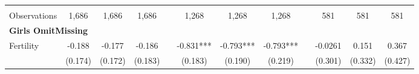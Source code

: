 \begin{landscape}
\begin{table}[htpb!]
\begin{center}
\begin{tabular}{lcccp{2mm}cccp{2mm}ccc}
\begin{footnotesize}\end{footnotesize}&\begin{footnotesize}\end{footnotesize}&\begin{footnotesize}\end{footnotesize}&\begin{footnotesize}\end{footnotesize}&\begin{footnotesize}\end{footnotesize}&\begin{footnotesize}\end{footnotesize}&\begin{footnotesize}\end{footnotesize}&\begin{footnotesize}\end{footnotesize}&\begin{footnotesize}\end{footnotesize}&\begin{footnotesize}\end{footnotesize}&\begin{footnotesize}\end{footnotesize}&\begin{footnotesize}\end{footnotesize}\\Observations&1,686&1,686&1,686&&1,268&1,268&1,268&&581&581&581\\
\multicolumn{12}{l}{\textbf{Girls OmitMissing}}\\ 
Fertility&-0.188&-0.177&-0.186&&-0.831***&-0.793***&-0.793***&&-0.0261&0.151&0.367\\
&(0.174)&(0.172)&(0.183)&&(0.183)&(0.190)&(0.219)&&(0.301)&(0.332)&(0.427)\\

\end{tabular}
\end{center}
\end{table}
\end{landscape}
